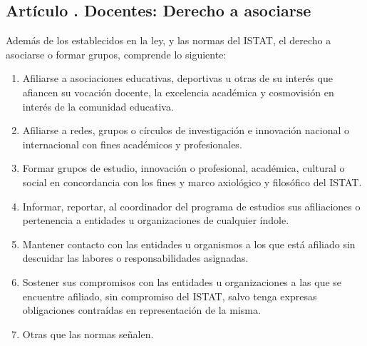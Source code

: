\subsection{Artículo . Docentes: Derecho a asociarse}
\addtocounter{ns}{1}
Además de los establecidos en la ley, y las normas del ISTAT, el derecho a asociarse o formar grupos, comprende lo siguiente: 
\begin{enumerate}
\item Afiliarse a asociaciones educativas, deportivas u otras de su interés que afiancen su vocación docente, la excelencia académica y cosmovisión en interés de la comunidad educativa.  
\item Afiliarse a redes, grupos o círculos de investigación e innovación nacional o internacional con fines académicos y profesionales. 
\item Formar grupos de estudio, innovación o profesional, académica, cultural o social en concordancia con los fines y marco axiológico y filosófico del ISTAT.   
\item Informar, reportar, al coordinador del programa de estudios sus afiliaciones o pertenencia a entidades u organizaciones de cualquier índole. 
\item Mantener contacto con las entidades u organismos a los que está afiliado sin descuidar las labores o responsabilidades asignadas. 
\item Sostener sus compromisos con las entidades u organizaciones a las que se encuentre afiliado, sin compromiso del ISTAT, salvo tenga expresas obligaciones contraídas en representación de la misma. 
\item Otras que las normas señalen. 
\end{enumerate}
